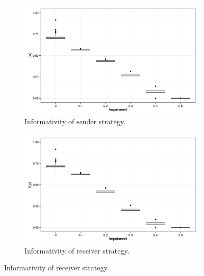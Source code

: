 \begin{figure}
        \begin{subfigure}{0.45\textwidth}
                \includegraphics[width=\textwidth]{plots/Speaker-informativity-20140813-194306}
                \caption{Informativity of sender strategy.}
        \end{subfigure}
        \begin{subfigure}{0.45\textwidth}
                \includegraphics[width=\textwidth]{plots/Hearer-informativity-20140813-194306}
                \caption{Informativity of receiver strategy.}
        \end{subfigure}


\end{figure}

